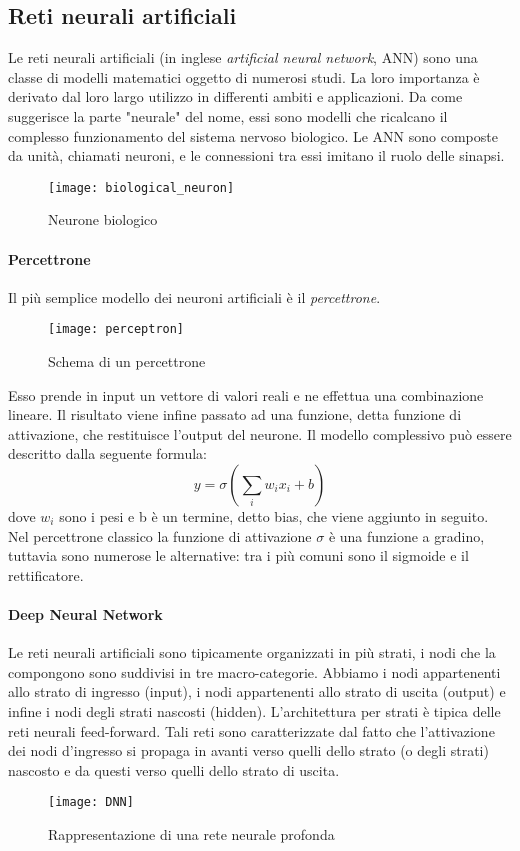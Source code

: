 \subsection{Reti neurali artificiali}
Le reti neurali artificiali (in inglese \textit{artificial neural network}, ANN) sono una classe di modelli matematici oggetto di numerosi studi. La loro importanza è derivato dal loro largo utilizzo in differenti ambiti e applicazioni. Da come suggerisce la parte "neurale" del nome, essi sono modelli che ricalcano il complesso funzionamento del sistema nervoso biologico. Le ANN sono composte da unità, chiamati neuroni, e le connessioni tra essi imitano il ruolo delle sinapsi.
\begin{figure}[ht]
    \centering
    \texttt{[image: biological\_neuron]}
    \caption[Neurone biologico]{Neurone biologico}
\end{figure}
\paragraph{Percettrone}
Il più semplice modello dei neuroni artificiali è il \textit{percettrone}. 
\begin{figure}[ht]
    \centering
    \texttt{[image: perceptron]}
    \caption[Percettrone]{Schema di un percettrone}
\end{figure}
Esso prende in input un vettore di valori reali e ne effettua una combinazione lineare. Il risultato viene infine passato ad una funzione, detta funzione di attivazione, che restituisce l'output del neurone. Il modello complessivo può essere descritto dalla seguente formula: 
$$y=\sigma(\sum_{i} w_{i}x_{i}+b)$$
dove $w_{i}$ sono i pesi e b è un termine, detto bias, che viene aggiunto in seguito. Nel percettrone classico la funzione di attivazione $\sigma$ è una funzione a gradino, tuttavia sono numerose le alternative: tra i più comuni sono il sigmoide e il rettificatore.
\paragraph{Deep Neural Network} 
Le reti neurali artificiali sono tipicamente organizzati in più strati, i nodi che la compongono sono suddivisi in tre macro-categorie. Abbiamo i nodi appartenenti allo strato di ingresso (input), i nodi appartenenti allo strato di uscita (output) e infine i nodi degli strati nascosti (hidden). L’architettura per strati è tipica delle reti neurali feed-forward. Tali reti sono caratterizzate dal fatto che l’attivazione dei nodi d’ingresso si propaga in avanti verso quelli dello strato (o degli strati) nascosto e da questi verso quelli dello strato di uscita.
\begin{figure}[ht]
    \centering
    \texttt{[image: DNN]}
    \caption[Deep Neural Network]{Rappresentazione di una rete neurale profonda}
\end{figure}

